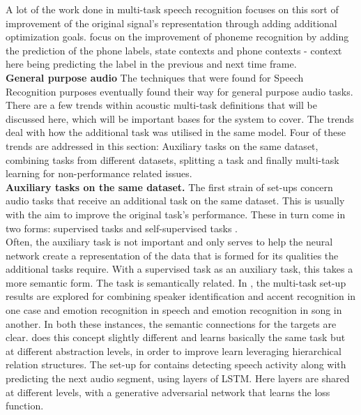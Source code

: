 A lot of the work done in multi-task speech recognition focuses on this sort of improvement of the original signal's representation through adding additional optimization goals. \cite{seltzer2013multi} focus on the improvement of phoneme recognition by adding the prediction of the phone labels, state contexts and phone contexts - context here being predicting the label in the previous and next time frame. \\

\textbf{General purpose audio} The techniques that were found for Speech Recognition purposes eventually found their way for general purpose audio tasks. There are a few trends within acoustic multi-task definitions that will be discussed here, which will be important bases for the system to cover.  The trends deal with how the additional task was utilised in the same model. Four of these trends are addressed in this section: Auxiliary tasks on the same dataset, combining tasks from different datasets, splitting a task and finally multi-task learning for non-performance related issues. \\

\textbf{Auxiliary tasks on the same dataset.} The first strain of set-ups concern audio tasks that receive an additional task on the same dataset. This is usually with the aim to improve the original task's performance. These in turn come in two forms: supervised tasks \citep{kim2017speech} \citep{zeng2019spectrogram} \citep{abrol2020learning} \citep{fernando2020temporarily} \citep{wu2020domain} \citep{sun2017compressed} \citep{lopez2019keyword} \citep{panchapagesan2016multi} and self-supervised tasks \citep{lee2019label}  \citep{deshmukh2020multi} \citep{pankajakshan2019polyphonic} \citep{lu2004multitask}.  \\

Often, the auxiliary task is not important and only serves to help the neural network create a representation of the data that is formed for its qualities the additional tasks require. With a supervised task as an auxiliary task, this takes a more semantic form. The task is semantically related. In \cite{zeng2019spectrogram}, the multi-task set-up results are explored for combining speaker identification and accent recognition in one case and emotion recognition in speech and emotion recognition in song in another. In both these instances, the semantic connections for the targets are clear.  \cite{abrol2020learning} does this concept slightly different and learns basically the same task but at different abstraction levels, in order to improve learn leveraging hierarchical relation structures. The set-up for \cite{fernando2020temporarily} contains detecting speech activity along with predicting the next audio segment, using layers of LSTM. Here layers  are shared at different levels, with a generative adversarial network that learns the loss function.\\


